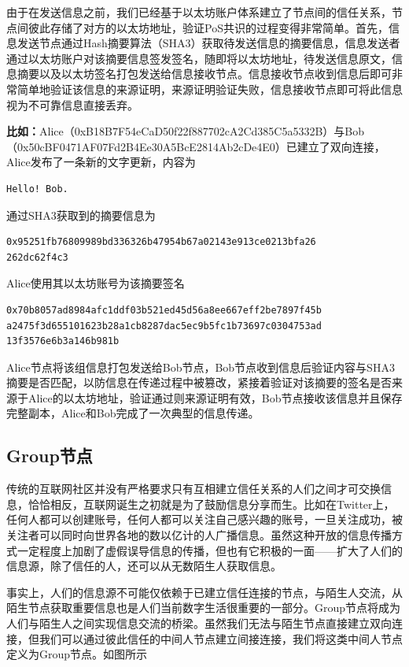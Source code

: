 \documentclass[12pt,a4paper]{extarticle}
\begin{document}
    由于在发送信息之前，我们已经基于以太坊账户体系建立了节点间的信任关系，节点间彼此存储了对方的以太坊地址，验证PoS共识的过程变得非常简单。首先，信息发送节点通过Hash摘要算法（SHA3）获取待发送信息的摘要信息，信息发送者通过以太坊账户对该摘要信息签发签名，随即将以太坊地址，待发送信息原文，信息摘要以及以太坊签名打包发送给信息接收节点。信息接收节点收到信息后即可非常简单地验证该信息的来源证明，来源证明验证失败，信息接收节点即可将此信息视为不可靠信息直接丢弃。
    ~\newline
    \begin{blockqt}
    \textbf{比如：}Alice（0xB18B7F54eCaD50f22f887702cA2Cd385C5a5332B）与Bob（0x50cBF0471AF07Fd2B4Ee30A5BcE2814Ab2cDe4E0）已建立了双向连接，Alice发布了一条新的文字更新，内容为
    
    \begin{lstlisting}[caption=Message from Alice, numbers=none]
Hello! Bob.
    \end{lstlisting}
    通过SHA3获取到的摘要信息为
    \begin{lstlisting}[caption=SHA3 digest of message, numbers=none, breaklines=true]
0x95251fb76809989bd336326b47954b67a02143e913ce0213bfa26
262dc62f4c3
    \end{lstlisting}
    Alice使用其以太坊账号为该摘要签名
    \begin{lstlisting}[caption=Signature, numbers=none]
0x70b8057ad8984afc1ddf03b521ed45d56a8ee667eff2be7897f45b
a2475f3d655101623b28a1cb8287dac5ec9b5fc1b73697c0304753ad
13f3576e6b3a146b981b
    \end{lstlisting}
    Alice节点将该组信息打包发送给Bob节点，Bob节点收到信息后验证内容与SHA3摘要是否匹配，以防信息在传递过程中被篡改，紧接着验证对该摘要的签名是否来源于Alice的以太坊地址，验证通过则来源证明有效，Bob节点接收该信息并且保存完整副本，Alice和Bob完成了一次典型的信息传递。
    \end{blockqt}
\subsection{Group节点}\label{group_node}
    传统的互联网社区并没有严格要求只有互相建立信任关系的人们之间才可交换信息，恰恰相反，互联网诞生之初就是为了鼓励信息分享而生。比如在Twitter上，任何人都可以创建账号，任何人都可以关注自己感兴趣的账号，一旦关注成功，被关注者可以同时向世界各地的数以亿计的人广播信息。虽然这种开放的信息传播方式一定程度上加剧了虚假误导信息的传播，但也有它积极的一面------扩大了人们的信息源，除了信任的人，还可以从无数陌生人获取信息。

    事实上，人们的信息源不可能仅依赖于已建立信任连接的节点，与陌生人交流，从陌生节点获取重要信息也是人们当前数字生活很重要的一部分。Group节点将成为人们与陌生人之间实现信息交流的桥梁。虽然我们无法与陌生节点直接建立双向连接，但我们可以通过彼此信任的中间人节点建立间接连接，我们将这类中间人节点定义为Group节点。如图所示
\end{document}
